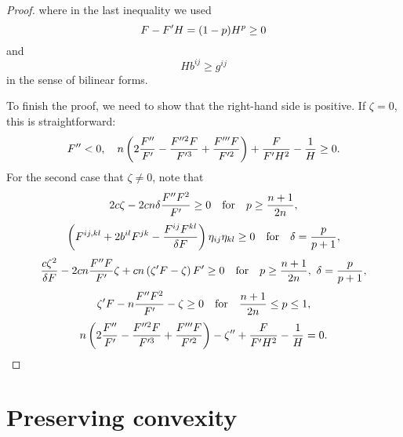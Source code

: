 \documentclass{amsart}
\begin{document}
\begin{proof}
where in the last inequality we used
$$F-F'H=(1-p)H^p\geq 0$$
and
$$Hb^{ij}\geq g^{ij}$$
in the sense of bilinear forms.

To finish the proof, we need to show that the right-hand side is positive. If $\zeta=0$, this is straightforward:
\[F''<0,\quad n\left(2\frac{F''}{F'}-\frac{F''^{2}F}{F'^{3}}+\frac{F'''F}{F'^{2}}\right)+\frac{F}{F'H^2}-\frac{1}{H}\geq 0.\]
For the second case that $\zeta\neq 0$, note that
$$2c\zeta-2cn\delta\frac{F''F^2}{F'}\geq 0\quad\mbox{for}\quad p\geq \frac{n+1}{2n},$$
$$\left(F^{ij,kl}+2b^{il}F^{jk}-\frac{F^{ij}F^{kl}}{\delta F}\right)\eta_{ij}\eta_{kl}\geq0\quad\mbox{for}\quad\delta=\frac{p}{p+1},$$
$$\frac{c\zeta^2}{\delta F}-2cn\frac{F''F}{F'}\zeta+cn\left(\zeta'F-\zeta\right)F'\geq 0\quad\mbox{for}\quad p\geq\frac{n+1}{2n},~\delta=\frac{p}{p+1},$$
$$\zeta'F-n\frac{F''F^2}{F'}-\zeta\geq 0\quad\mbox{for}\quad\frac{n+1}{2n}\leq p\leq 1,$$
$$n\left(2\frac{F''}{F'}-\frac{F''^{2}F}{F'^{3}}+\frac{F'''F}{F'^{2}}\right)-\zeta''+\frac{F}{F'H^2}-\frac{1}{H}=0.$$
\end{proof}

\section{Preserving convexity}
\label{sec:convexity}
\end{document}
